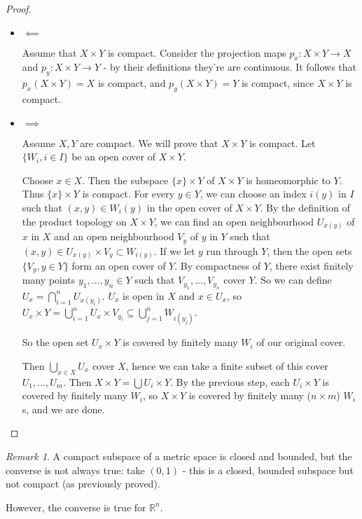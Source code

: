 \documentclass{article}
\theoremstyle{definition}
\theoremstyle{plain}%
\theoremstyle{remark}
\newtheorem*{rem}{Remark}
\newcommand{\Union}{\bigcup}
\newcommand{\Intersection}{\bigcap}
\newcommand{\R}{\mathbb{R}}
\begin{document}
\begin{proof}
    \begin{itemize}
        \item $\impliedby$
        
        Assume that $X \times Y$ is compact. Consider the projection maps $p_x : X\times Y \to X$ and $p_y : X \times Y \to Y$ - by their definitions they're are continuous. It follows that $p_x(X \times Y) = X$ is compact, and $p_y(X \times Y) = Y$ is compact, since $X \times Y$ is compact.
        \item $\implies$
        
        Assume $X, Y$ are compact. We will prove that $X \times Y$ is compact. Let $\{W_i, i \in I\}$ be an open cover of $X \times Y$.
        
        Choose $x \in X$. Then the subspace $\{x\} \times Y$ of $X \times Y$ is homeomorphic to $Y$. Thus $\{x\}\times Y$ is compact. For every $y \in Y$, we can choose an index $i(y)$ in $I$ such that $(x,y) \in W_i(y)$ in the open cover of $X \times Y$. By the definition of the product topology on $X \times Y$, we can find an open neighbourhood $U_{x(y)}$ of $x$ in $X$ and an open neighbourhood $V_y$ of $y$ in $Y$ such that $(x,y) \in U_{x(y)} \times V_y \subset W_{i(y)}$. If we let $y$ run through $Y$, then the open sets $\{V_y, y \in Y\}$ form an open cover of $Y$. By compactness of $Y$, there exist finitely many points $y_1, ..., y_n \in Y$ such that $V_{y_1}, ..., V_{y_n}$ cover $Y$. So we can define $U_{x} = \Intersection_{i=1}^n U_{x(y_i)}$. $U_x$ is open in $X$ and $x \in U_x$, so $U_x \times Y = \Union_{i=1}^n U_x \times V_{y_i} \subseteq \Union_{j = 1}^n W_{i(y_j)}$.
        
        So the open set $U_x \times Y$ is covered by finitely many $W_i$ of our original cover.
        
        Then $\Union_{x \in X} U_x$ cover $X$, hence we can take a finite subset of this cover $U_1, ..., U_m$. Then $X \times Y = \Union U_{i} \times Y$. By the previous step, each $U_i \times Y$ is covered by finitely many $W_i$, so $X \times Y$ is covered by finitely many ($n \times m$) $W_i$s, and we are done.
    \end{itemize}
\end{proof}

\begin{rem}
    A compact subspace of a metric space is closed and bounded, but the converse is not always true: take $(0,1)$ - this is a closed, bounded subspace but not compact (as previously proved).
    
    However, the converse is true for $\R^n$.
\end{rem}
\end{document}
